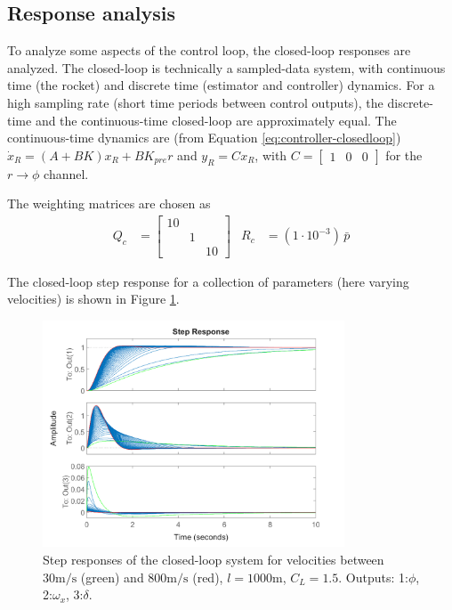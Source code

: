 \subsection{Response analysis}
To analyze some aspects of the control loop, the closed-loop responses are analyzed.
The closed-loop is technically a sampled-data system, with continuous time (the rocket) and discrete time (estimator and controller) dynamics.
For a high sampling rate (short time periods between control outputs), the discrete-time and the continuous-time closed-loop are approximately equal. 
The continuous-time dynamics are (from Equation \ref{eq:controller-closedloop})
$ \dot x_R = (A+BK) x_R + B K_{pre} r$ and $ y_R = C x_R $, with $C = \begin{bmatrix} 1 & 0 & 0 \end{bmatrix}$ for the $r \to \phi$ channel.

The weighting matrices are chosen as 
\begin{align}
    Q_c &= \begin{bmatrix}
        10 & & \\ & 1 & \\ & & 10  
        \end{bmatrix}
    &
    R_c &= (1 \cdot 10^{-3})\,  \bar p
\end{align}

The closed-loop step response for a collection of parameters (here varying velocities) is shown in Figure \ref{fig:controller-steps}.

\begin{figure}[ht!]
    \centering
    \includegraphics[width=0.8\textwidth]{images-design/controller_steps.png}
    \caption[Closed-loop step responses]{Step responses of the closed-loop system for velocities between $30\mathrm{m/s}$ (green) and $800\mathrm{m/s}$ (red), $l=1000\mathrm{m}$, $C_L = 1.5$. Outputs: 1:$\phi$, 2:$\omega_x$, 3:$\delta$.}
    \label{fig:controller-steps}
\end{figure}

